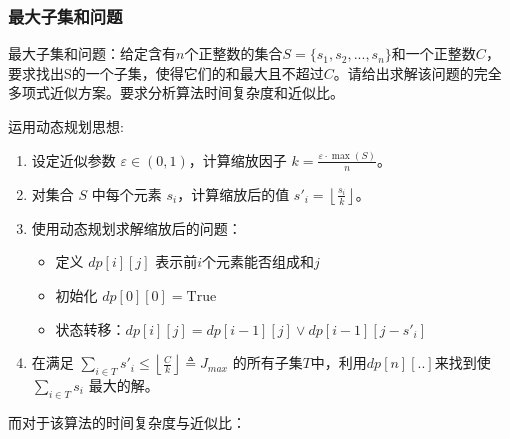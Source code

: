 \documentclass[./../main.tex]{subfiles} %
\begin{document}
\subsubsection{最大子集和问题}
最大子集和问题：给定含有$n$个正整数的集合$S=\{s_1,s_2,...,s_n\}$和一个正整数$C$，要求找出S的一个子集，使得它们的和最大且不超过$C$。请给出求解该问题的完全多项式近似方案。要求分析算法时间复杂度和近似比。

运用动态规划思想:
\begin{enumerate}
    \item 设定近似参数 $\varepsilon \in (0,1)$，计算缩放因子 $k = \frac{\varepsilon \cdot \max(S)}{n}$。
    \item 对集合 $S$ 中每个元素 $s_i$，计算缩放后的值 $s'_i = \left\lfloor \frac{s_i}{k} \right\rfloor$。
    \item 使用动态规划求解缩放后的问题：
    \begin{itemize}
        \item 定义 $dp[i][j]$ 表示前$i$个元素能否组成和$j$
        \item 初始化 $dp[0][0] = \text{True}$
        \item 状态转移：$dp[i][j] = dp[i-1][j] \lor dp[i-1][j-s'_i]$
    \end{itemize}
    \item 在满足 $\sum_{i \in T} s'_i \leq \left\lfloor \frac{C}{k} \right\rfloor\triangleq J_{max}$ 的所有子集$T$中，利用$dp[n][..]$来找到使 $\sum_{i \in T} s_i$ 最大的解。
\end{enumerate}

而对于该算法的时间复杂度与近似比：
\end{document}
